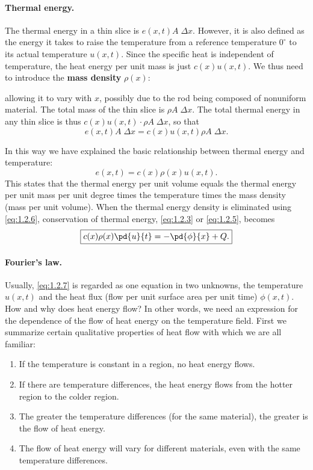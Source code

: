 \paragraph{Thermal energy.}
The thermal energy in a thin slice is $e(x,t) A\;\Delta x$. However, it is also defined as the energy it takes to raise the temperature from a reference temperature $0^\circ$ to its actual temperature $u(x,t)$. Since the specific heat is independent of temperature, the heat energy per unit mass is just $c(x) u(x,t)$. We thus need to introduce the \textbf{mass density} $\rho(x)$:

\begin{center}
\end{center}

\noindent allowing it to vary with $x$, possibly due to the rod being composed of nonuniform material. The total mass of the thin slice is $\rho A\;\Delta x$. The total thermal energy in any thin slice is thus $c(x) u(x,t) \cdot \rho A\;\Delta x$, so that
\[
e(x,t) A\;\Delta x = c(x) u(x,t) \rho A\;\Delta x.
\]

In this way we have explained the basic relationship between thermal energy and temperature:
\begin{equation}
\boxed{e(x,t) = c(x)\rho(x) u(x,t).}
\label{eq:1.2.6}
\end{equation}
This states that the thermal energy per unit volume equals the thermal energy per unit mass per unit degree times the temperature times the mass density (mass per unit volume). When the thermal energy density is eliminated using \eqref{eq:1.2.6}, conservation of thermal energy, \eqref{eq:1.2.3} or \eqref{eq:1.2.5}, becomes
\begin{equation}
\boxed{c(x)\rho(x)\pd{u}{t} = -\pd{\phi}{x} + Q.}
\label{eq:1.2.7}
\end{equation}

\paragraph{Fourier's law.}
Usually, \eqref{eq:1.2.7} is regarded as one equation in two unknowns, the temperature $u(x,t)$ and the heat flux (flow per unit surface area per unit time) $\phi(x,t)$. How and why does heat energy flow? In other words, we need an expression for the dependence of the flow of heat energy on the temperature field. First we summarize certain qualitative properties of heat flow with which we are all familiar:
\begin{enumerate}
\item If the temperature is constant in a region, no heat energy flows.
\item If there are temperature differences, the heat energy flows from the hotter region to the colder region.
\item The greater the temperature differences (for the same material), the greater is the flow of heat energy.
\item The flow of heat energy will vary for different materials, even with the same temperature differences.
\end{enumerate}

